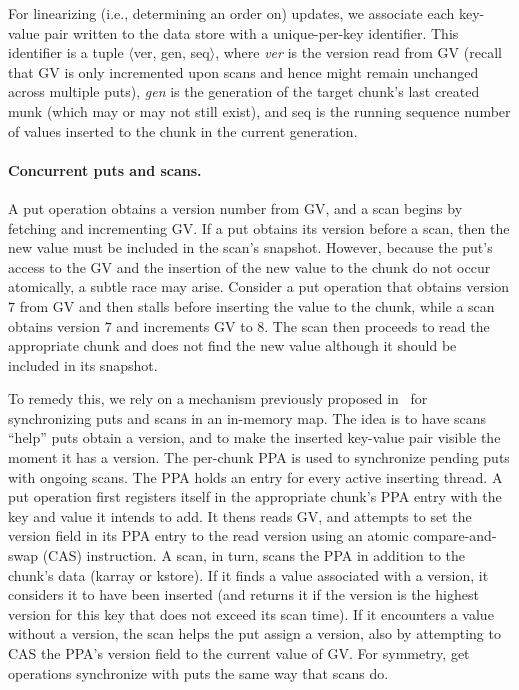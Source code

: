 For linearizing (i.e., determining an order on) updates, we associate each key-value pair written to the data store 
with a unique-per-key identifier.
This identifier is a tuple $\langle$ver, gen, seq$\rangle$, where \emph{ver} is  the version read from GV 
(recall that GV is only incremented upon scans and hence might remain unchanged across multiple puts),
\emph{gen} is the generation of the target chunk's last created munk  (which may or may not still exist), 
and seq is the running sequence number of values inserted to the chunk in the current generation.

\paragraph{Concurrent puts and scans.}

A put operation obtains a version number from GV, and a scan begins by fetching and incrementing GV.
If a put obtains its version before a scan, then the new value must be included in the scan's snapshot. 
However, because the put's access to the GV and the insertion of the new value to the chunk do not occur atomically,
a subtle race may arise. Consider a put operation that obtains version $7$ from GV and then stalls before
inserting the value to the chunk, while a scan obtains version $7$ and increments GV to $8$. The scan then proceeds 
to read the appropriate chunk and does not find the new value although it should be included in its snapshot.

To remedy this, we rely on a mechanism previously proposed in~\cite{kiwi} for synchronizing puts and scans in an in-memory map.  
The idea is to have scans ``help'' puts obtain a version, and to make the inserted key-value pair visible the moment it has a version.
The per-chunk PPA is used to synchronize pending puts  with ongoing scans. 
The PPA holds an entry for every active inserting thread.
A put operation first registers itself in the appropriate chunk's PPA entry with the key and value it intends to add.
It thens reads GV, and attempts to set the version field in its PPA entry to the read version using an atomic 
compare-and-swap (CAS) instruction. A scan, in turn, scans the PPA in addition to the chunk's data (karray 
or kstore). If it finds a value associated with a version, it considers it to have been inserted (and returns it if the version is
the highest version for this key that does not exceed its scan time). If it encounters a value without a version, the scan helps the put
assign a version, also by attempting to CAS the PPA's version field to the current value of GV.
For symmetry, get operations synchronize with puts the same way that scans do. 

